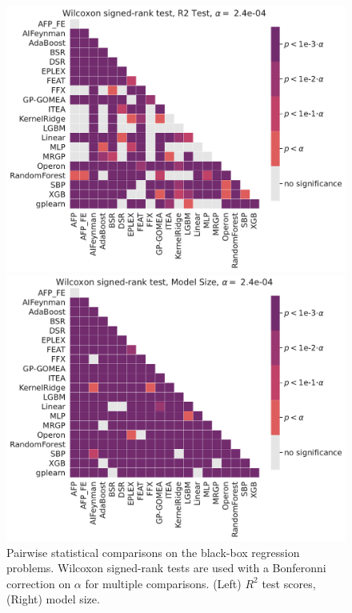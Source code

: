 \begin{figure}
    \begin{minipage}{0.5\textwidth}
        \includegraphics[width=\textwidth]{figs/Pairwise_comparison_of_R2_Test_on_black-box_problems.pdf}
    \end{minipage}
    \begin{minipage}{0.5\textwidth}

        \includegraphics[width=\textwidth]{figs/Pairwise_comparison_of_Model_Size_on_black-box_problems.pdf}
    \end{minipage}
        \caption{ 
            Pairwise statistical comparisons on the black-box regression problems. 
            Wilcoxon signed-rank tests are used with a Bonferonni correction on $\alpha$ for multiple comparisons.
            (Left) $R^2$ test scores, (Right) model size. 
        }
        \label{fig:heat_stats_bb}
\end{figure}




